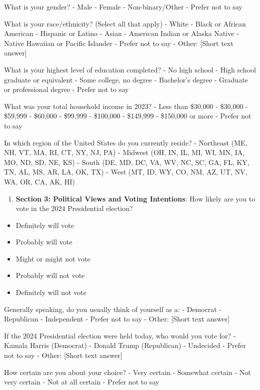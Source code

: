\documentclass[
  letterpaper,
  DIV=11,
  numbers=noendperiod]{scrartcl}
\providecommand{\tightlist}{%
  \setlength{\itemsep}{0pt}\setlength{\parskip}{0pt}}\usepackage{longtable,booktabs,array}
\begin{document}
What is your gender? - Male - Female - Non-binary/Other - Prefer not to
say

What is your race/ethnicity? (Select all that apply) - White - Black or
African American - Hispanic or Latino - Asian - American Indian or
Alaska Native - Native Hawaiian or Pacific Islander - Prefer not to say
- Other: {[}Short text answer{]}

What is your highest level of education completed? - No high school -
High school graduate or equivalent - Some college, no degree -
Bachelor's degree - Graduate or professional degree - Prefer not to say

What was your total household income in 2023? - Less than \$30,000 -
\$30,000 - \$59,999 - \$60,000 - \$99,999 - \$100,000 - \$149,999 -
\$150,000 or more - Prefer not to say

In which region of the United States do you currently reside? -
Northeast (ME, NH, VT, MA, RI, CT, NY, NJ, PA) - Midwest (OH, IN, IL,
MI, WI, MN, IA, MO, ND, SD, NE, KS) - South (DE, MD, DC, VA, WV, NC, SC,
GA, FL, KY, TN, AL, MS, AR, LA, OK, TX) - West (MT, ID, WY, CO, NM, AZ,
UT, NV, WA, OR, CA, AK, HI)

\begin{enumerate}
\def\labelenumi{\arabic{enumi}.}
\setcounter{enumi}{3}
\tightlist
\item
  \textbf{Section 3: Political Views and Voting Intentions}: How likely
  are you to vote in the 2024 Presidential election?
\end{enumerate}

\begin{itemize}
\tightlist
\item
  Definitely will vote
\item
  Probably will vote
\item
  Might or might not vote
\item
  Probably will not vote
\item
  Definitely will not vote
\end{itemize}

Generally speaking, do you usually think of yourself as a: - Democrat -
Republican - Independent - Prefer not to say - Other: {[}Short text
answer{]}

If the 2024 Presidential election were held today, who would you vote
for? - Kamala Harris (Democrat) - Donald Trump (Republican) - Undecided
- Prefer not to say - Other: {[}Short text answer{]}

How certain are you about your choice? - Very certain - Somewhat certain
- Not very certain - Not at all certain - Prefer not to say
\end{document}
